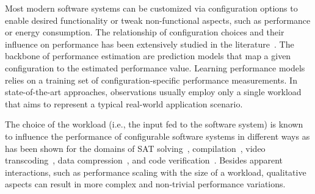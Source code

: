 
Most modern software systems can be customized via configuration options to  enable desired functionality or tweak non-functional aspects, such as  performance or energy consumption. The relationship of configuration choices and their influence on performance has been extensively studied in the literature~\cite{dorn2020,siegmundPerformanceinfluenceModelsHighly2015,haDeepPerf2019,perfAL,guoVariabilityawarePerformancePrediction2013,sarkarCostEfficientSamplingPerformance,guo_2018_data,fourier_learning_2015,perLasso,chen_hinnperf_2022}. The backbone of performance estimation are prediction models that map a given configuration to the estimated performance value. Learning performance models relies on a training set of configuration-specific performance measurements. In state-of-the-art approaches, observations usually employ only a single workload that aims to represent a typical real-world application scenario.

The choice of the workload (i.e., the input fed to the software system) is known to influence the performance of configurable software systems in different ways as has been shown for the domains of SAT solving~\cite{falkner_sat_solvers_2015,satzilla_2008}, compilation~\cite{ding_compilation_2015,plotnikov_compilation_2013}, video transcoding~\cite{maxiaguine_workload_2004,alves_sampling_2020}, data compression~\cite{khavari_compression_2019}, and code verification~\cite{koc_satune_2021}. Besides apparent interactions, such as performance scaling with the size of a workload, qualitative aspects can result in more complex and non-trivial performance variations.

